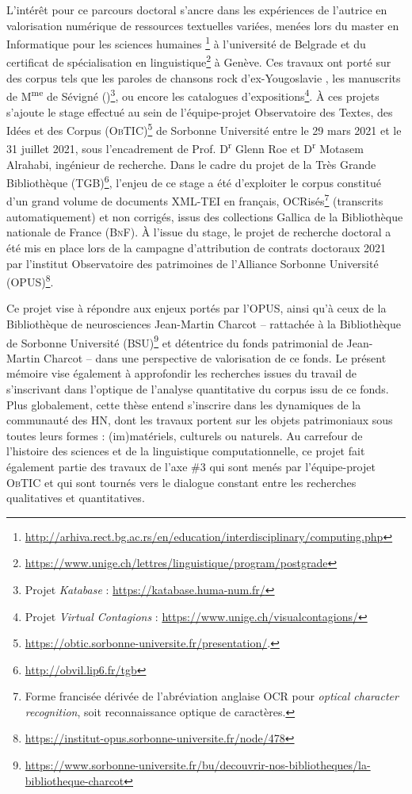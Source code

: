 L’intérêt pour ce parcours doctoral s'ancre dans les expériences de l'autrice en valorisation numérique de ressources textuelles variées, menées lors du master en \og Informatique pour les sciences humaines \fg{}\footnote{\url{http://arhiva.rect.bg.ac.rs/en/education/interdisciplinary/computing.php}} à l'université de Belgrade et du certificat de spécialisation en linguistique\footnote{\url{https://www.unige.ch/lettres/linguistique/program/postgrade}} à Genève. Ces travaux ont porté sur des corpus tels que les paroles de chansons rock d’ex-Yougoslavie \citep{petkovic2019creation}, les manuscrits de M\textsuperscript{me} de Sévigné (\citealp{gabay2020quantifying,gabay2021katabase})\footnote{Projet \textit{Katabase} : \url{https://katabase.huma-num.fr/}}, ou encore les catalogues d’expositions\footnote{Projet \textit{Virtual Contagions} : \url{https://www.unige.ch/visualcontagions/}}.
À ces projets s'ajoute le stage effectué au sein de l'équipe-projet Observatoire des Textes, des Idées et des Corpus (\textsc{ObTIC})\footnote{\url{https://obtic.sorbonne-universite.fr/presentation/}.} de Sorbonne Université entre le 29 mars 2021 et le 31 juillet 2021, sous l'encadrement de Prof. D\textsuperscript{r} Glenn Roe et D\textsuperscript{r} Motasem Alrahabi, ingénieur de recherche. Dans le cadre du projet de la Très Grande Bibliothèque (\textsc{TGB})\footnote{\url{http://obvil.lip6.fr/tgb}}, l'enjeu de ce stage a été d'exploiter le corpus constitué d'un grand volume de documents \textsc{XML-TEI} en français, OCRisés\footnote{Forme francisée dérivée de l'abréviation anglaise \textsc{OCR} pour \textit{optical character recognition}, soit \og{}reconnaissance optique de caractères\fg{}.} (transcrits automatiquement) et non corrigés, issus des collections Gallica de la Bibliothèque nationale de France (\textsc{BnF}). 
À l'issue du stage, le projet de recherche doctoral a été mis en place lors de la campagne d'attribution de contrats doctoraux 2021 par l'institut Observatoire des patrimoines de l'Alliance Sorbonne Université (\textsc{OPUS})\footnote{\url{https://institut-opus.sorbonne-universite.fr/node/478}}. 

Ce projet vise à répondre aux enjeux portés par l'\textsc{OPUS}, ainsi qu'à ceux de la Bibliothèque de neurosciences Jean-Martin Charcot -- rattachée à la Bibliothèque de Sorbonne Université (\textsc{BSU})\footnote{\url{https://www.sorbonne-universite.fr/bu/decouvrir-nos-bibliotheques/la-bibliotheque-charcot}} et détentrice du fonds patrimonial de Jean-Martin Charcot -- dans une perspective de valorisation de ce fonds. Le présent mémoire vise également à approfondir les recherches issues du travail de \citet{petkovic2023circulation} s'inscrivant dans l'optique de l'analyse quantitative du corpus issu de ce fonds. Plus globalement, cette thèse entend s'inscrire dans les dynamiques de la communauté des \textsc{HN}, dont les travaux portent sur les objets patrimoniaux sous toutes leurs formes : (im)matériels, culturels ou naturels. Au carrefour de l'histoire des sciences et de la linguistique computationnelle, ce projet fait également partie des travaux de l'axe \#3 qui sont menés par l'équipe-projet \textsc{ObTIC} et qui sont tournés vers le dialogue constant entre les recherches qualitatives et quantitatives. 

